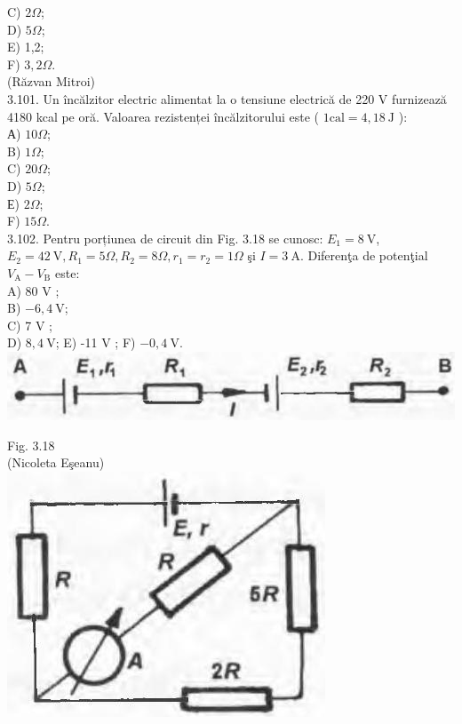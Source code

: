 \documentclass[10pt]{article}
\begin{document}
C) $2 \Omega$;\\
D) $5 \Omega$;\\
E) 1,2;\\
F) $3,2 \Omega$.\\
(Răzvan Mitroi)\\
3.101. Un încălzitor electric alimentat la o tensiune electrică de 220 V furnizează 4180 kcal pe oră. Valoarea rezistenței încălzitorului este ( $1 \mathrm{cal}=4,18 \mathrm{~J}$ ):\\
А) $10 \Omega$;\\
B) $1 \Omega$;\\
C) $20 \Omega$;\\
D) $5 \Omega$;\\
Е) $2 \Omega$;\\
F) $15 \Omega$.\\
3.102. Pentru porțiunea de circuit din Fig. 3.18 se cunosc: $E_{1}=8 \mathrm{~V}$, $E_{2}=42 \mathrm{~V}, R_{1}=5 \Omega, R_{2}=8 \Omega, r_{1}=r_{2}=1 \Omega$ şi $I=3 \mathrm{~A}$. Diferenţa de potenţial $V_{\mathrm{A}}-V_{\mathrm{B}}$ este:\\
A) 80 V ;\\
B) $-6,4 \mathrm{~V}$;\\
C) 7 V ;\\
D) $8,4 \mathrm{~V}$; E) -11 V ; F) $-0,4 \mathrm{~V}$.\\
\includegraphics[max width=\textwidth, center]{2025_07_01_5b3ff9fa0d508c8e9f17g-166}

Fig. 3.18\\
(Nicoleta Eşeanu)\\
\includegraphics[max width=\textwidth, center]{2025_07_01_5b3ff9fa0d508c8e9f17g-166(1)}
\end{document}

